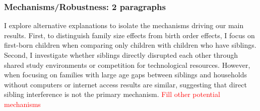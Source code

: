 


\subsubsection{Mechanisms/Robustness: 2 paragraphs}

I explore alternative explanations to isolate the mechanisms driving our main results. First, to distinguish family size effects from birth order effects, I focus on first-born children when comparing only children with children who have siblings. Second, I investigate whether siblings directly disrupted each other through shared study environments or competition for technological resources. However, when focusing on families with large age gaps between siblings and households without computers or internet access results are similar, suggesting that direct sibling interference is not the primary mechanism. \textcolor{red}{Fill other potential mechanisms}

